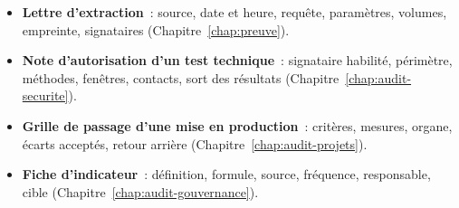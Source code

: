 \begin{itemize}
    \item \textbf{Lettre d'extraction}~: source, date et heure, requête,
          paramètres, volumes, empreinte, signataires
          (Chapitre~\ref{chap:preuve}).
    \item \textbf{Note d'autorisation d'un test technique}~: signataire
          habilité, périmètre, méthodes, fenêtres, contacts, sort des
          résultats (Chapitre~\ref{chap:audit-securite}).
    \item \textbf{Grille de passage d'une mise en production}~: critères,
          mesures, organe, écarts acceptés, retour arrière
          (Chapitre~\ref{chap:audit-projets}).
    \item \textbf{Fiche d'indicateur}~: définition, formule, source,
          fréquence, responsable, cible (Chapitre~\ref{chap:audit-gouvernance}).
\end{itemize}
